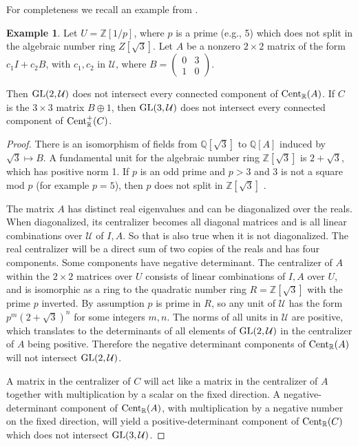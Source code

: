 \documentclass{amsart}
\theoremstyle{definition}
\newtheorem{example}[theorem]{Example}
\theoremstyle{remark}
\numberwithin{equation}{section}
\begin{document}
{{For completeness we recall an example from \cite{KR4}. 

\begin{example} \label{badcentralizer} 
Let $U=\mathbb Z[1/p]$, where $p$ is a prime 
(e.g., 5)  which does not split in the algebraic number ring 
$Z[\sqrt 3]$.
Let $A$ be a nonzero $2\times 2$ matrix of the form 
$c_1I + c_2B$, with $c_1, c_2$ in $\mathcal U$, where 
$B= \left(\begin{smallmatrix} 0 & 3 \\1 & 0
\end{smallmatrix} \right)$. 

Then $\textnormal{GL}(2,\mathcal U)$ 
does not intersect every connected component of  
$\textnormal{Cent}_{\mathbb R}(A)$.  
If $C$ is the $3\times 3 $ matrix $B\oplus 1$, then  
$\textnormal{GL}(3,\mathcal U)$ 
does not intersect every connected component of  
$\textnormal{Cent}^+_{\mathbb R}(C)$.  
\end{example} 
\begin{proof} 
There is an isomorphism of fields from $\mathbb Q[\sqrt 3]$ to 
$\mathbb Q[A]$ induced by 
$\sqrt 3 \mapsto B$. 
A fundamental unit for the algebraic number 
ring $\mathbb Z[\sqrt 3]$ is  $2+\sqrt 3$, which has positive norm 1. 
If $p$ is an odd prime and $p>3$ and $3$ is not a 
square mod $p$ (for example $p=5$), 
then  $p$ does not split in $\mathbb Z[\sqrt 3]$  
 \cite[p.74]{Ma}. 

 The
matrix $A$ has distinct real eigenvalues and can be diagonalized over the reals. When
diagonalized, its centralizer becomes all diagonal matrices and is all linear 
combinations over $\mathcal U$ 
of $I,A$. So that is also true when it is not diagonalized. The real centralizer will be a
direct sum of two copies of the reals and has four components. Some components have negative
determinant. The centralizer of $A$ 
within the $2\times 2$ matrices over $U$ consists of linear combinations of $I,A$
over $U$, and is isomorphic as a ring to the quadratic number ring $R=\mathbb Z[\sqrt 3]$ 
with the prime $p$ inverted. By assumption $p$ is prime in $R$, so any unit of 
$\mathcal U$ has the form $p^m(2+\sqrt 3)^n$ for some integers $m,n$. The norms of 
all units in $\mathcal U$ are positive, which translates to the determinants of 
all elements of $\textnormal{GL}(2,\mathcal U)$ in the centralizer of $A$ being positive. 
Therefore the negative determinant 
components of $\textnormal{Cent}_{\mathbb R}(A)$ will not intersect 
$\textnormal{GL}(2,\mathcal U)$. 

A matrix in the centralizer of  $C$ will act like a matrix in the centralizer 
of $A$ together with multiplication by a  scalar on the 
fixed direction. A negative-determinant component of 
$\textnormal{Cent}_{\mathbb R}(A)$, with multiplication by a negative 
number on the fixed direction, will yield a positive-determinant 
component  of $\textnormal{Cent}_{\mathbb R}(C)$ which does not intersect 
$\textnormal{GL}(3,\mathcal U)$. 
\end{proof} 

}}
\end{document}
